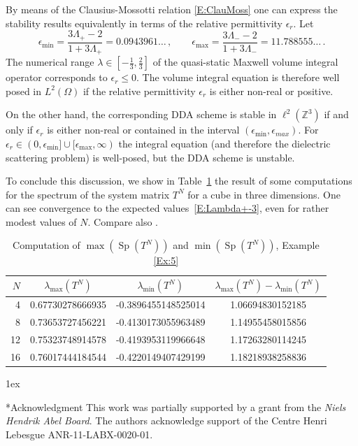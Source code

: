\documentclass[12pt]{amsart}
\makeatletter
\def\subsection{\@startsection{section}{1}%
  \z@{1.2\linespacing\@plus\linespacing}{.5\linespacing}%
  {\normalfont\scshape\centering}}
\def\subsection{\@startsection{subsection}{2}%
  \z@{0.9\linespacing\@plus.7\linespacing}{-.5em}%
  {\normalfont\bfseries}}
\theoremstyle{definition}
\theoremstyle{remark}
\numberwithin{equation}{section}
\newcommand\Z{{\mathbb Z}}
\newcommand{\Sp}{\mathop{\mathrm{Sp}}\nolimits}
\makeatother
\begin{document}
By means of the Clausius-Mossotti relation \eqref{E:ClauMoss} one can express the stability results equivalently in terms of the relative permittivity $\epsilon_{r}$. Let
\begin{equation}
\label{E:epsminmax}
 \epsilon_{\min} = \frac{3\Lambda_{+}-2}{1+3\Lambda_{+}}=0.0943961\dots
 \,,\qquad
 \epsilon_{\max} = \frac{3\Lambda_{-}-2}{1+3\Lambda_{-}}=11.788555\dots\,.
\end{equation}
The numerical range $\lambda\in[-\frac13,\frac23]$ of the quasi-static Maxwell volume integral operator corresponds to $\epsilon_{r}\le0$. The volume integral equation is therefore well posed in $L^{2}(\Omega)$ if the relative permittivity $\epsilon_{r}$ is either non-real or positive.

On the other hand, the corresponding DDA scheme is stable in $\ell^{2}(\Z^{3})$ if and only if $\epsilon_{r}$ is either non-real or contained in the interval 
$(\epsilon_{\min},\epsilon_{max})$. 
For $\epsilon_{r}\in(0,\epsilon_{\min}]\cup[\epsilon_{\max},\infty)$ the integral equation (and therefore the dielectric scattering problem) is well-posed, but the DDA scheme is unstable. 

To conclude this discussion, we show in Table~\ref{T:maxminEVEx5} the result of some computations for the spectrum of the system matrix $T^{N}$ for a cube in three dimensions. 
One can see convergence to the expected values~\eqref{E:Lambda+-3}, even for rather modest values of $N$. Compare also \cite[FIG. 8]{YurkinMinHoekstra2010}.
\begin{table}[htbp]
   \centering
    \begin{tabular}{@{} rccc @{}} %
      \toprule
      $N$    &  $\lambda_{\max}(T^{N})$ & $\lambda_{\min}(T^{N})$ & 
                                            $\lambda_{\max}(T^{N})-\lambda_{\min}(T^{N})$\\
      \midrule
4 & 0.67730278666935 & -0.3896455148525014 & 1.06694830152185\\
8 & 0.73653727456221 & -0.4130173055963489 & 1.14955458015856\\
12 & 0.75323748914578 &  -0.4193953119966648 & 1.17263280114245\\
16 & 0.76017444184544 & -0.4220149407429199 & 1.18218938258836\\
      \bottomrule
   \end{tabular}\vglue1ex
   \caption{Computation of $\max(\Sp(T^{N}))$ and $\min(\Sp(T^{N}))$, Example \ref{Ex:5}}
   \label{T:maxminEVEx5}
\end{table}

\subsection*{Acknowledgment}
This work was partially supported by a grant from the \textit{Niels Hendrik Abel Board}.
The authors acknowledge support of the Centre Henri Lebesgue ANR-11-LABX-0020-01.


                        
 
\end{document}
